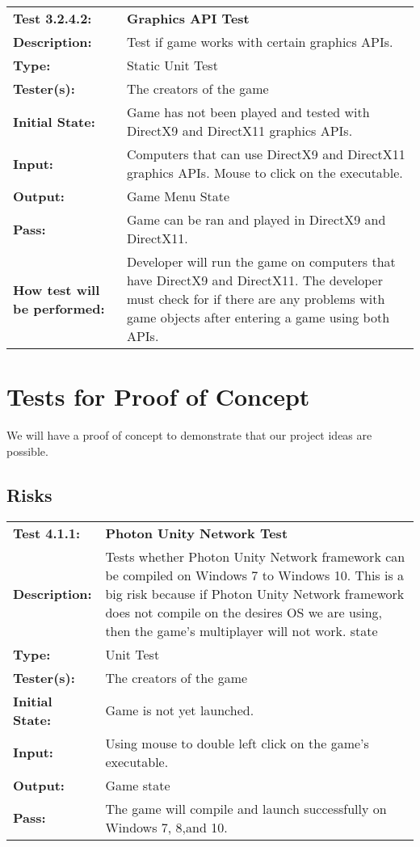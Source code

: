 \documentclass[12pt, titlepage]{article}
\begin{document}
\begin{mdframed}[linewidth=1pt]
\begin{tabularx}{\textwidth}{@{}p{3cm}X@{}}
{\bf Test 3.2.4.2:} & {\bf Graphics API Test}\\[\baselineskip]
{\bf Description:} & Test if game works with certain graphics APIs.\\[0.5\baselineskip]
{\bf Type:} & Static Unit Test\\[0.5\baselineskip]
{\bf Tester(s):} & The creators of the game\\[0.5\baselineskip]
{\bf Initial State:} & Game has not been played and tested with DirectX9 and DirectX11 graphics APIs.\\[0.5\baselineskip]
{\bf Input:} & Computers that can use DirectX9 and DirectX11 graphics APIs. Mouse to click on the executable.\\[0.5\baselineskip]
{\bf Output:} & Game Menu State\\[0.5\baselineskip]
{\bf Pass:} & Game can be ran and played in DirectX9 and DirectX11.\\[0.5\baselineskip]
{\bf How test will be performed:} & Developer will run the game on computers that have DirectX9 and DirectX11. The developer must check for if there are any problems with game objects after entering a game using both APIs.
\end{tabularx}
\end{mdframed}

\newpage
\section{Tests for Proof of Concept}
We will have a proof of concept to demonstrate that our project ideas are possible.
\subsection{Risks}

\begin{mdframed}[linewidth=1pt]
\begin{tabularx}{\textwidth}{@{}p{3cm}X@{}}
{\bf Test 4.1.1:} & {\bf Photon Unity Network Test}\\[\baselineskip]
{\bf Description:} & Tests whether Photon Unity Network framework can be compiled on Windows 7 to Windows 10. This is a big risk because if Photon Unity Network framework does not compile on the desires OS we are using, then the game's multiplayer will not work. state\\[0.5\baselineskip]
{\bf Type:} & Unit Test\\[0.5\baselineskip]
{\bf Tester(s):} & The creators of the game\\[0.5\baselineskip]
{\bf Initial State:} & Game is not yet launched.\\[0.5\baselineskip]
{\bf Input:} & Using mouse to double left click on the game's executable.\\[0.5\baselineskip]
{\bf Output:} & Game state\\[0.5\baselineskip]
{\bf Pass:} & The game will compile and launch successfully on Windows 7, 8,and 10.
\end{tabularx}
\end{mdframed}
\end{document}
